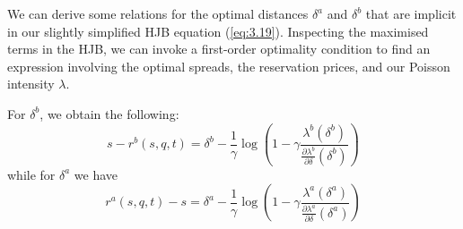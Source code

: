We can derive some relations for the optimal distances $\delta^a$ and $\delta^b$
that are implicit in our slightly simplified HJB equation (\ref{eq:3.19}). Inspecting
the maximised terms in the HJB, we can invoke a first-order optimality condition to
find an expression involving the optimal spreads, the reservation prices, and our 
Poisson intensity $\lambda$. 
\begin{theorem}
    For $\delta^b$, we obtain the following:
    \begin{equation}\label{eq:3.22}
        s-r^b(s,q,t)=\delta^b-\frac{1}{\gamma}\log\left(1-\gamma\frac{\lambda^b(\delta^b)}{\frac{\partial\lambda^b}{\partial\delta}(\delta^b)}\right)
    \end{equation}
    while for $\delta^a$ we have
    \begin{equation}\label{eq:3.23}
        r^a(s,q,t)-s=\delta^a-\frac{1}{\gamma}\log\left(1-\gamma\frac{\lambda^a(\delta^a)}{\frac{\partial\lambda^a}{\partial\delta}(\delta^a)}\right)
    \end{equation}
\end{theorem}
